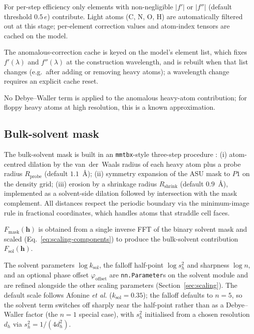 \documentclass{iucrjournals}
\begin{document}
For per-step efficiency only elements with non-negligible $|f'|$ or
$|f''|$ (default threshold $0.5\,e$) contribute.  Light atoms (C, N, O, H)
are automatically filtered out at this stage; per-element correction values
and atom-index tensors are cached on the model.

The anomalous-correction cache is keyed on the model's element list, which
fixes $f'(\lambda)$ and $f''(\lambda)$ at the construction wavelength, and is
rebuilt when that list changes (e.g.\ after adding or removing heavy atoms);
a wavelength change requires an explicit cache reset.

No Debye--Waller term is applied to the anomalous heavy-atom
contribution; for floppy heavy atoms at high resolution, this is a
known approximation.

\subsection{Bulk-solvent mask}

The bulk-solvent mask is built in an \texttt{mmtbx}-style three-step procedure
\cite{afonine_robust_2005}: (i) atom-centred dilation by the
van~der~Waals radius of each heavy atom plus a probe radius
$R_\mathrm{probe}$ (default $1.1$~\AA{}); (ii) symmetry expansion of the
ASU mask to $P1$ on the density grid; (iii) erosion by a shrinkage
radius $R_\mathrm{shrink}$ (default $0.9$~\AA{}), implemented as a
solvent-side dilation followed by intersection with the mask
complement.  All distances respect the periodic boundary via the
minimum-image rule in fractional coordinates, which handles atoms that
straddle cell faces.

$F_\mathrm{mask}(\mathbf{h})$ is obtained from a single inverse FFT of the binary
solvent mask and scaled (Eq.~\ref{eq:scaling-components}) to produce the
bulk-solvent contribution $F_\mathrm{sol}(\mathbf{h})$.

The solvent parameters $\log k_\mathrm{sol}$, the falloff half-point
$\log s_{h}^{2}$ and sharpness $\log n$, and an optional phase offset
$\varphi_\mathrm{offset}$ are \texttt{nn.Parameter}s on the solvent module and are
refined alongside the other scaling parameters (Section~\ref{sec:scaling}).
The default scale follows Afonine \emph{et al.\/} ($k_\mathrm{sol} = 0.35$); the
falloff defaults to $n = 5$, so the solvent term switches off sharply near the
half-point rather than as a Debye--Waller factor (the $n = 1$ special case), with
$s_{h}^{2}$ initialised from a chosen resolution $d_{h}$ via
$s_{h}^{2} = 1/(4 d_{h}^{2})$.
\end{document}
